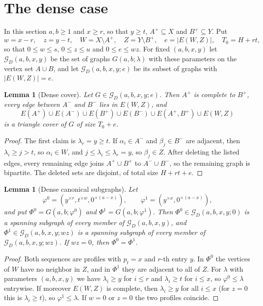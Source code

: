 \documentclass{amsart}
\newtheorem{lemma}[theorem]{Lemma}
\theoremstyle{definition}
\numberwithin{equation}{section}
\numberwithin{table}{section}
\newcommand{\rep}[2]{#1^{\times #2}}
\begin{document}
\section{The dense case}\label{sec:dense}

In this section $a,b\ge 1$ and $x\ge r$, so that $y\ge t$, $A^+\subseteq X$ and $B^+\subseteq Y$. Put
\[
w=x-r,\quad z=y-t,\quad W=X\setminus A^+,\quad Z=Y\setminus B^+,\quad e=|E(W,Z)|,\quad T_0=H+rt,
\]
so that $0\le w\le s$, $0\le z\le u$ and $0\le e\le wz$. For fixed $(a,b,x,y)$ let $\mathcal G_D(a,b,x,y)$ be the set of graphs $G(a,b;\lambda)$ with these parameters on the vertex set $A\cup B$, and let $\mathcal G_D(a,b,x,y;e)$ be its subset of graphs with $|E(W,Z)|=e$.

\begin{lemma}[Dense cover]\label{lem:dense-cover}
Let $G\in\mathcal G_D(a,b,x,y;e)$. Then $A^+$ is complete to $B^+$, every edge between $A^-$ and $B^-$ lies in $E(W,Z)$, and
\[
E(A^+)\cup E(A^-)\cup E(B^+)\cup E(B^-)\cup E(A^+,B^+)\cup E(W,Z)
\]
is a triangle cover of $G$ of size $T_0+e$.
\end{lemma}

\begin{proof}
The first claim is $\lambda_r=y\ge t$. If $\alpha_i\in A^-$ and $\beta_j\in B^-$ are adjacent, then $\lambda_i\ge j>t$, so $\alpha_i\in W$, and $j\le\lambda_i\le\lambda_r=y$, so $\beta_j\in Z$. After deleting the listed edges, every remaining edge joins $A^+\cup B^+$ to $A^-\cup B^-$, so the remaining graph is bipartite. The deleted sets are disjoint, of total size $H+rt+e$.
\end{proof}

\begin{lemma}[Dense canonical subgraphs]\label{lem:dense-canonical}
Let
\[
\varphi^0=(\rep{y}{r},\rep{t}{w},\rep{0}{(a-x)}),\qquad \varphi^1=(\rep{y}{x},\rep{0}{(a-x)}),
\]
and put $\Phi^0=G(a,b;\varphi^0)$ and $\Phi^1=G(a,b;\varphi^1)$. Then $\Phi^0\in\mathcal G_D(a,b,x,y;0)$ is a spanning subgraph of every member of $\mathcal G_D(a,b,x,y)$, and $\Phi^1\in\mathcal G_D(a,b,x,y;wz)$ is a spanning subgraph of every member of $\mathcal G_D(a,b,x,y;wz)$. If $wz=0$, then $\Phi^0=\Phi^1$.
\end{lemma}

\begin{proof}
Both sequences are profiles with $p_t=x$ and $r$-th entry $y$. In $\Phi^0$ the vertices of $W$ have no neighbor in $Z$, and in $\Phi^1$ they are adjacent to all of $Z$. For $\lambda$ with parameters $(a,b,x,y)$ we have $\lambda_i\ge y$ for $i\le r$ and $\lambda_i\ge t$ for $i\le x$, so $\varphi^0\le\lambda$ entrywise. If moreover $E(W,Z)$ is complete, then $\lambda_i\ge y$ for all $i\le x$ (for $z=0$ this is $\lambda_i\ge t$), so $\varphi^1\le\lambda$. If $w=0$ or $z=0$ the two profiles coincide.
\end{proof}
\end{document}
